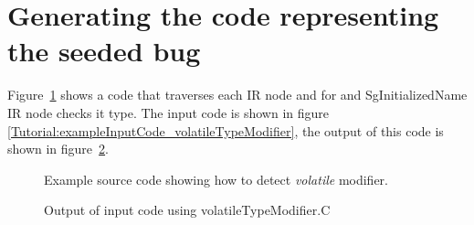 \section{Generating the code representing the seeded bug}

    Figure~\ref{Tutorial:example_volatileTypeModifier}
shows a code that traverses each IR node and for and
SgInitializedName IR node checks it type.
The input code is shown in figure \ref{Tutorial:exampleInputCode_volatileTypeModifier},
the output of this code is shown in 
figure~\ref{Tutorial:exampleOutput_volatileTypeModifier}.


\begin{figure}[!h]
{\indent
{
\mySmallestFontSize

\begin{latexonly}
   
\end{latexonly}

\begin{htmlonly}
   
\end{htmlonly}

}
}
\caption{Example source code showing how to detect {\em volatile} modifier. }
\label{Tutorial:example_volatileTypeModifier}
\end{figure}


\begin{figure}[!h]
{\indent
{\mySmallFontSize

\begin{latexonly}
   
\end{latexonly}

\begin{htmlonly}
   
\end{htmlonly}

}
}
\caption{Output of input code using volatileTypeModifier.C}
\label{Tutorial:exampleOutput_volatileTypeModifier}
\end{figure}

